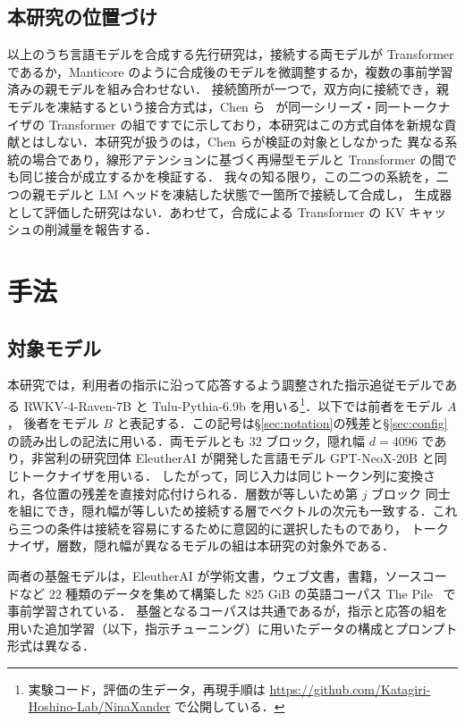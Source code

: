 \documentclass[techrep,noauthor]{ipsj}
\begin{document}
\subsection{本研究の位置づけ}
以上のうち言語モデルを合成する先行研究は，接続する両モデルが Transformer であるか，Manticore のように合成後のモデルを微調整するか，複数の事前学習済みの親モデルを組み合わせない．
接続箇所が一つで，双方向に接続でき，親モデルを凍結するという接合方式は，Chen ら~\cite{chen2025transferring} が同一シリーズ・同一トークナイザの
Transformer の組ですでに示しており，本研究はこの方式自体を新規な貢献とはしない．本研究が扱うのは，Chen らが検証の対象としなかった
異なる系統の場合であり，線形アテンションに基づく再帰型モデルと Transformer の間でも同じ接合が成立するかを検証する．
我々の知る限り，この二つの系統を，二つの親モデルと LM ヘッドを凍結した状態で一箇所で接続して合成し，
生成器として評価した研究はない．あわせて，合成による Transformer の KV キャッシュの削減量を報告する．

\section{手法}\label{sec:method}
\subsection{対象モデル}
本研究では，利用者の指示に沿って応答するよう調整された指示追従モデルである RWKV-4-Raven-7B と Tulu-Pythia-6.9b を用いる\footnote{実験コード，評価の生データ，再現手順は \url{https://github.com/Katagiri-Hoshino-Lab/NinaXander} で公開している．}．以下では前者をモデル $A$，
後者をモデル $B$ と表記する．この記号は\S\ref{sec:notation}の残差と\S\ref{sec:config}の読み出しの記法に用いる．両モデルとも $32$ ブロック，隠れ幅 $d{=}4096$ であり，非営利の研究団体 EleutherAI が開発した言語モデル GPT-NeoX-20B と同じトークナイザを用いる．
したがって，同じ入力は同じトークン列に変換され，各位置の残差を直接対応付けられる．層数が等しいため第 $j$ ブロック
同士を組にでき，隠れ幅が等しいため接続する層でベクトルの次元も一致する．これら三つの条件は接続を容易にするために意図的に選択したものであり，
トークナイザ，層数，隠れ幅が異なるモデルの組は本研究の対象外である．

両者の基盤モデルは，EleutherAI が学術文書，ウェブ文書，書籍，ソースコードなど $22$ 種類のデータを集めて構築した $825$ GiB の英語コーパス The Pile~\cite{gao2020pile} で事前学習されている．
基盤となるコーパスは共通であるが，指示と応答の組を用いた追加学習（以下，指示チューニング）に用いたデータの構成とプロンプト形式は異なる．
\end{document}
